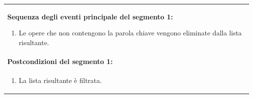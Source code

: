 \documentclass{article}
\begin{document}
\begin{table}[H]
\begin{tabular}{|p{\linewidth}|}
\begin{minipage}{\linewidth}
                        \end{minipage} \\
                        \hline
                        \textbf{Sequenza degli eventi principale del segmento 1:}
                        \begin{enumerate}
                            \item Le opere che non contengono la parola chiave vengono eliminate dalla lista risultante.
                        \end{enumerate} \\
                        \hline
                        \cellcolor{gray!20}
                        \textbf{Postcondizioni del segmento 1:} \\
                        \cellcolor{gray!20}
                        \begin{minipage}{\linewidth}
                            \begin{enumerate}
                                \item La lista risultante è filtrata.
                            \end{enumerate}
                        \end{minipage} \\
                        \hline
                    \end{tabular}
                \end{table}
\end{document}
